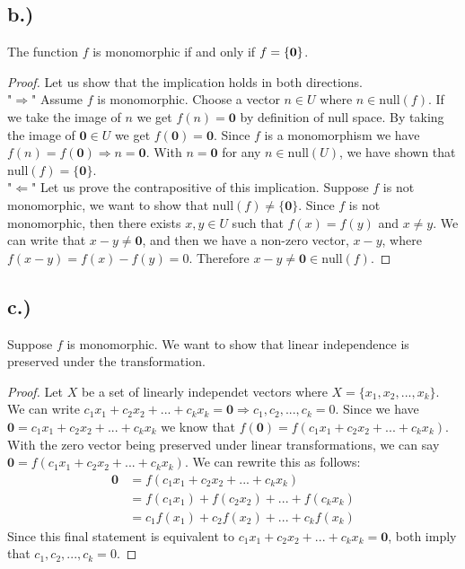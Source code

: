 \documentclass{article}
\begin{document}
	\subsection*{b.)}
		The function $f$ is monomorphic if and only if $\null f = \{ \mathbf{0} \}$.
		\begin{proof}
			Let us show that the implication holds in both directions. \\

			"$\Rightarrow$" Assume $f$ is monomorphic. Choose a vector $n \in U$ where $n \in \text{null}(f)$.
			If we take the image of $n$ we get $f(n) = \mathbf{0}$ by definition of null space.
			By taking the image of $\mathbf{0} \in U$ we get $f(\mathbf{0}) = \mathbf{0}$.
			Since $f$ is a monomorphism we have $f(n) =f(\mathbf{0}) \Rightarrow n = \mathbf{0}$.
			With $n = \mathbf{0}$ for any $n \in \text{null}(U)$, we have shown that $\text{null}(f) = \{ \mathbf{0} \}$.\\

			"$\Leftarrow$" Let us prove the contrapositive of this implication.
			Suppose $f$ is not monomorphic, we want to show that $\text{null}(f) \neq \{ \mathbf{0} \}$.
			Since $f$ is not monomorphic, then there exists $x, y \in U$ such that $f(x) = f(y)$ and $x \neq y$.
			We can write that $x - y \neq \mathbf{0}$, and then we have a non-zero vector, $x-y$, where $f(x-y) = f(x) - f(y) = 0$.
			Therefore $x - y \neq \mathbf{0} \in \text{null}(f)$.

		\end{proof}
	\subsection*{c.)}
		Suppose $f$ is monomorphic. We want to show that linear independence is preserved under the transformation.
		\begin{proof}
			Let $X$ be a set of linearly independet vectors where $X = \{ x_1, x_2, ... , x_k \}$.
			We can write $c_1x_1 + c_2x_2 + ... + c_kx_k = \mathbf{0} \Rightarrow c_1,c_2,...,c_k = 0$.
			Since we have $\mathbf{0} = c_1x_1 + c_2x_2 +... + c_kx_k$ we know that $f(\mathbf{0}) = f(c_1x_1 +c_2x_2+...+c_kx_k)$.
			With the zero vector being preserved under linear transformations,  we can say $\mathbf{0}=f(c_1x_1 +c_2x_2+...+c_kx_k)$.
			We can rewrite  this as follows:
			\begin{align*}
				\mathbf{0} & =f(c_1x_1 +c_2x_2+...+c_kx_k) \\
				& = f(c_1x_1) + f(c_2x_2) + ... + f(c_kx_k) \\
				& = c_1f(x_1)+c_2f(x_2)+...+c_kf(x_k)
			\end{align*}
			Since  this final statement is equivalent to $c_1x_1 + c_2x_2 + ... + c_kx_k = \mathbf{0}$, both imply that $c_1, c_2,...,c_k = 0$.
			
		\end{proof}
\end{document}
